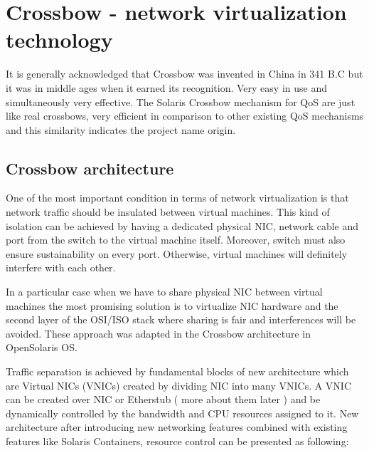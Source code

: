 \documentclass[11pt]{book}
\begin{document}
    \section{Crossbow - network virtualization technology}
    \label{sec:sol:xbow}


      It is generally acknowledged that Crossbow was invented in China in 341 B.C but it was in middle ages when 
      it earned its recognition. Very easy in use and simultaneously very effective. The Solaris Crossbow mechanism 
      for QoS are just like real crossbows, very efficient in comparison to other existing QoS mechanisms and this
      similarity indicates the project name origin.


      \subsection{Crossbow architecture}

        One of the most important condition in terms of network virtualization is that network traffic should be
        insulated between virtual machines. This kind of isolation can be achieved by having a dedicated physical NIC,
        network cable and port from the switch to the virtual machine itself. Moreover, switch must also ensure
        sustainability on every port. Otherwise, virtual machines will definitely interfere with each other.
        
        In a particular case when we have to share physical NIC between virtual machines the most promising solution is
        to virtualize NIC hardware and the second layer of the OSI/ISO stack where sharing is fair and interferences
        will be avoided. These approach was adapted in the Crossbow architecture in OpenSolaris OS.
        
        Traffic separation is achieved by fundamental blocks of new architecture which are Virtual NICs (VNICs) created
        by dividing NIC into many VNICs. A VNIC can be created over NIC or Etherstub ( more about them later ) and be
        dynamically controlled by the bandwidth and CPU resources assigned to it. New architecture after introducing new
        networking features combined with existing features like Solaris Containers, resource control can be presented
        as following:
\end{document}
